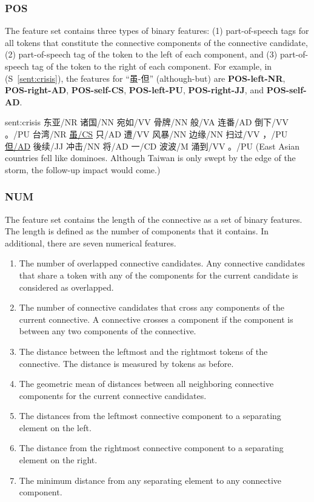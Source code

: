 


\subsubsection{POS}

The feature set contains three types of binary features:
(1) part-of-speech tags for all tokens that constitute the connective components
of the connective candidate,
(2) part-of-speech tag of the token to the left of each component, and
(3) part-of-speech tag of the token to the right of each component. For example,
in (S~\ref{sent:crisis}), the features for ``虽-但'' (although-but) are
\textbf{POS-left-NR}, \textbf{POS-right-AD}, \textbf{POS-self-CS},
\textbf{POS-left-PU}, \textbf{POS-right-JJ}, and \textbf{POS-self-AD}.

\begin{sent}{sent:crisis}{}
    东亚/NR 诸国/NN 宛如/VV 骨牌/NN 般/VA 连番/AD 倒下/VV 。/PU
    台湾/NR \underline{虽/CS} 只/AD 遭/VV 风暴/NN 边缘/NN 扫过/VV ，/PU
    \underline{但/AD} 後续/JJ 冲击/NN 将/AD 一/CD 波波/M 涌到/VV 。/PU
    (East Asian countries fell like dominoes.
    Although Taiwan is only swept by the edge of the storm,
    the follow-up impact would come.)
\end{sent}

\subsubsection{NUM}

The feature set contains the length of the connective as a set
of binary features. The length is defined as the number of components
that it contains.
In additional, there are seven numerical features.
\begin{enumerate}
    \item The number of overlapped connective candidates. Any connective
        candidates that share a token with any of the components for the current
        candidate is considered as overlapped.
    \item The number of connective candidates that cross any
        components of the current connective. A connective crosses a component
        if the component is between any two components of the connective.
    \item The distance between the leftmost and the rightmost tokens of the connective.
        The distance is measured by tokens as before.
    \item The geometric mean of distances between all neighboring connective components for
        the current connective candidates.
    \item The distances from the leftmost connective component to a separating element on the left.
    \item The distance from the rightmost connective component to a separating element on the right.
    \item The minimum distance from any separating element to any connective component.
\end{enumerate}

